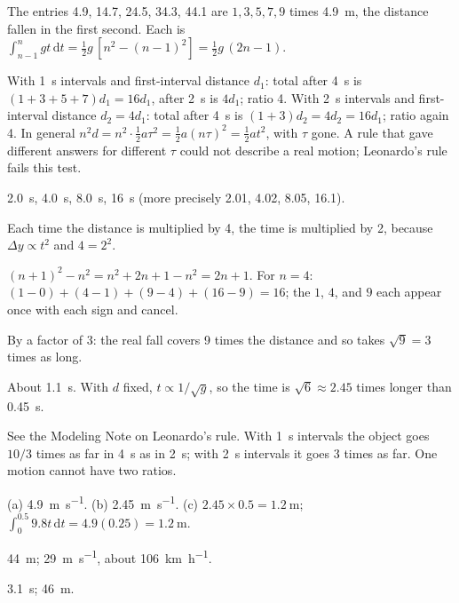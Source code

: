 \documentclass[11pt,twoside,openany]{book}
\newcommand{\dd}{\mathrm{d}}
\begin{document}
\begin{description}[leftmargin=2.6em,itemsep=3pt,style=sameline]
  \item[2.23] The entries \num{4.9}, \num{14.7}, \num{24.5}, \num{34.3}, \num{44.1} are $1, 3, 5, 7, 9$ times \SI{4.9}{\metre}, the distance fallen in the first second. Each is $\int_{n-1}^{n} gt\,\dd t = \tfrac12 g\,[n^2 - (n-1)^2] = \tfrac12 g\,(2n-1)$.
  \item[2.24] With \SI{1}{\second} intervals and first-interval distance $d_1$: total after \SI{4}{\second} is $(1+3+5+7)d_1 = 16d_1$, after \SI{2}{\second} is $4d_1$; ratio \num{4}. With \SI{2}{\second} intervals and first-interval distance $d_2 = 4d_1$: total after \SI{4}{\second} is $(1+3)d_2 = 4d_2 = 16d_1$; ratio again \num{4}. In general $n^2 d = n^2\cdot\tfrac12 a\tau^2 = \tfrac12 a (n\tau)^2 = \tfrac12 a t^2$, with $\tau$ gone. A rule that gave different answers for different $\tau$ could not describe a real motion; Leonardo's rule fails this test.
  \item[2.25] \SI{2.0}{\second}, \SI{4.0}{\second}, \SI{8.0}{\second}, \SI{16}{\second} (more precisely \num{2.01}, \num{4.02}, \num{8.05}, \num{16.1}).
  \item[2.26] Each time the distance is multiplied by \num{4}, the time is multiplied by \num{2}, because $\Delta y \propto t^2$ and $4 = 2^2$.
  \item[2.27] $(n+1)^2 - n^2 = n^2 + 2n + 1 - n^2 = 2n + 1$. For $n = 4$: $(1 - 0) + (4 - 1) + (9 - 4) + (16 - 9) = 16$; the $1$, $4$, and $9$ each appear once with each sign and cancel.
  \item[2.28] By a factor of \num{3}: the real fall covers \num{9} times the distance and so takes $\sqrt{9} = 3$ times as long.
  \item[2.29] About \SI{1.1}{\second}. With $d$ fixed, $t \propto 1/\sqrt{g}$, so the time is $\sqrt{6} \approx 2.45$ times longer than \SI{0.45}{\second}.
  \item[2.30] See the Modeling Note on Leonardo's rule. With \SI{1}{\second} intervals the object goes $10/3$ times as far in \SI{4}{\second} as in \SI{2}{\second}; with \SI{2}{\second} intervals it goes \num{3} times as far. One motion cannot have two ratios.
  \item[2.31] (a) \SI{4.9}{\metre\per\second}. (b) \SI{2.45}{\metre\per\second}. (c) $2.45 \times 0.5 = \SI{1.2}{\metre}$; $\int_0^{0.5} 9.8t\,\dd t = 4.9(0.25) = \SI{1.2}{\metre}$.
  \item[2.32] \SI{44}{\metre}; \SI{29}{\metre\per\second}, about \SI{106}{\kilo\metre\per\hour}.
  \item[2.33] \SI{3.1}{\second}; \SI{46}{\metre}.

\end{description}
\end{document}
